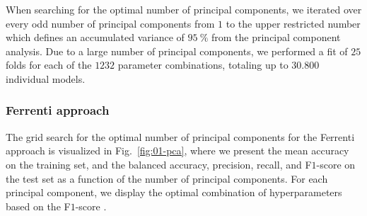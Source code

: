 \documentclass[superscriptaddress,unsortedaddress,
 amsmath,amssymb,
 aps,
]{revtex4-2}
\begin{document}
When searching for the optimal number of principal components, we iterated over every odd number of principal components from $1$ to the upper restricted number which defines an accumulated variance of $95 \ \%$ from the principal component analysis. Due to a large number of principal components, we performed a fit of  $25$ folds for each of the $1232$ parameter combinations, totaling up to $30.800$ individual models. 

\subsubsection*{Ferrenti approach}
The grid search for the optimal number of principal components for the Ferrenti approach is visualized in Fig.~\ref{fig:01-pca}, where we present the mean accuracy on the training set, and the balanced accuracy, precision, recall, and F$1$-score 
on the test set as a function of the number of principal components. For each principal component, we display the optimal combination of  hyperparameters based on the F$1$-score \cite{sammut2010,geron2022}.
\end{document}
